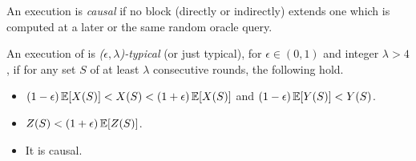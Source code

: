 



\begin{definition}[Causality]
  An execution is \emph{causal} if no block (directly or indirectly) extends
  one which is computed at a later or the same random oracle query.
\end{definition}

\begin{definition}
  An execution of \poem is \emph{($\epsilon,\lambda$)-typical} (or just typical),
  for $\epsilon \in (0,1)$ and integer $\lambda > 4$, if for any set $S$ of at
  least $\lambda$ consecutive rounds, the following hold.
  \begin{itemize}
    \item $(1 - \epsilon) \mathop{{}\mathbb{E}}[X(S)] < X(S) < (1 + \epsilon) \mathop{{}\mathbb{E}}[X(S)]$ and $(1-\epsilon) \mathop{{}\mathbb{E}}[Y(S)] < Y(S)$.
    \item $Z(S) < (1 + \epsilon)\mathop{{}\mathbb{E}}[Z(S)]$.
    \item It is causal.
  \end{itemize}
\end{definition}

